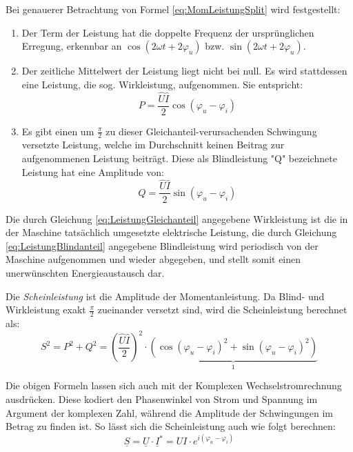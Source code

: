 Bei genauerer Betrachtung von Formel \eqref{eq:MomLeistungSplit} wird festgestellt:
\begin{enumerate}
\item Der Term der Leistung hat die doppelte Frequenz der ursprünglichen Erregung, erkennbar an $\cos(2\omega t + 2\varphi_u)$ bzw. $\sin(2\omega t + 2\varphi_u)$.

\item Der zeitliche Mittelwert der Leistung liegt nicht bei null. Es wird stattdessen eine Leistung, die sog. Wirkleistung, aufgenommen. Sie entspricht:
\begin{equation}
P = \frac{\hat{U}\hat{I}}{2}\cos(\varphi_u-\varphi_i) \label{eq:LeistungGleichanteil}
\end{equation}

\item Es gibt einen um $\frac{\pi}{2}$ zu dieser Gleichanteil-verursachenden Schwingung versetzte Leistung, welche im Durchschnitt keinen Beitrag zur aufgenommenen Leistung beiträgt. Diese als Blindleistung "Q" bezeichnete Leistung hat eine Amplitude von:
\begin{equation}
Q = \frac{\hat{U}\hat{I}}{2}\sin(\varphi_u - \varphi_i) \label{eq:LeistungBlindanteil}
\end{equation}
\end{enumerate}

Die durch Gleichung \eqref{eq:LeistungGleichanteil} angegebene Wirkleistung ist die in der Maschine tatsächlich umgesetzte elektrische Leistung, die durch Gleichung \eqref{eq:LeistungBlindanteil} angegebene Blindleistung wird periodisch von der Maschine aufgenommen und wieder abgegeben, und stellt somit einen unerwünschten Energieaustausch dar.

Die \textit{Scheinleistung} ist die Amplitude der Momentanleistung. Da Blind- und Wirkleistung exakt $\frac{\pi}{2}$ zueinander versetzt sind, wird die Scheinleistung berechnet als:
\begin{equation}
S^2=P^2 + Q^2 = \left(\frac{\hat{U}\hat{I}}{2}\right)^2\cdot \underbrace{(\cos(\varphi_u - \varphi_i)^2 + \sin(\varphi_u - \varphi_i)^2)}_{1}
\label{eq:ScheinleistungPythagoras}
\end{equation}

Die obigen Formeln lassen sich auch mit der Komplexen Wechselstromrechnung ausdrücken. Diese kodiert den Phasenwinkel von Strom und Spannung im Argument der komplexen Zahl, während die Amplitude der Schwingungen im Betrag zu finden ist. So lässt sich die Scheinleistung auch wie folgt berechnen:
\begin{equation}
\underline{S} = \underline{U}\cdot\underline{I}^* = UI\cdot e^{i(\varphi_u-\varphi_i)} \label{eq:KomplexS}
\end{equation}

